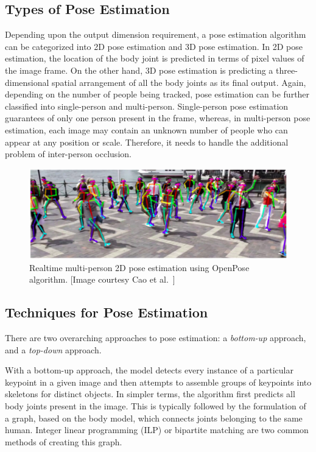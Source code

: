\subsection{Types of Pose Estimation} 
Depending upon the output dimension requirement, a pose estimation algorithm can be categorized into 2D pose estimation and 3D pose estimation. In 2D pose estimation, the location of the body joint is predicted in terms of pixel values of the image frame. On the other hand, 3D pose estimation is predicting a three-dimensional spatial arrangement of all the body joints as its final output. Again, depending on the number of people being tracked, pose estimation can be further classified into single-person and multi-person. Single-person pose estimation guarantees of only one person present in the frame, whereas, in multi-person pose estimation, each image may contain an unknown number of people who can appear at any position or scale. Therefore, it needs to handle the additional problem of inter-person occlusion. 

\begin{figure}[t]
	\centering
	\includegraphics[width=\textwidth]{figures/openpose_demo.eps}
	\caption[Realtime multi-person 2D pose estimation using OpenPose algorithm]
	{Realtime multi-person 2D pose estimation using OpenPose algorithm. [Image courtesy Cao et al.~\cite{Cao_19}] \label{fig:openpose_demo}}
\end{figure}


\subsection{Techniques for Pose Estimation} 
There are two overarching approaches to pose estimation: a \textit{bottom-up} approach, and a \textit{top-down }approach.

With a bottom-up approach, the model detects every instance of a particular keypoint in a given image and then attempts to assemble groups of keypoints into skeletons for distinct objects. In simpler terms, the algorithm first predicts all body joints present in the image. This is typically followed by the formulation of a graph, based on the body model, which connects joints belonging to the same human. Integer linear programming (ILP) or bipartite matching are two common methods of creating this graph.

